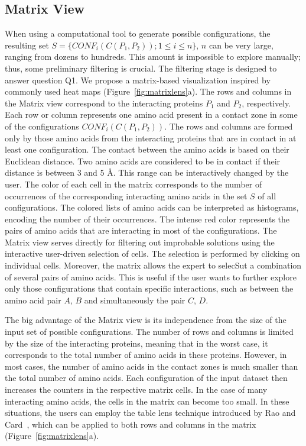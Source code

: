 \documentclass{bmcart}
\def\MatView {Matrix view\xspace}
\begin{document}
\subsection*{Matrix View}
\label{sec:matview}
When using a computational tool to generate possible configurations, the resulting set $S = \{CONF_i(C(P_1,P_2)); 1 \leq i \leq n\}$, $n$ can be very large, ranging from dozens to hundreds. 
This amount is impossible to explore manually; thus, some preliminary filtering is crucial.
The filtering stage is designed to answer question Q1.
We propose a matrix-based visualization inspired by commonly used heat maps (Figure~\ref{fig:matrixlens}a).
The rows and columns in the \MatView correspond to the interacting proteins $P_1$ and $P_2$, respectively.
Each row or column represents one amino acid present in a contact zone in some of the configurations $CONF_i(C(P_1,P_2))$. 
The rows and columns are formed only by those amino acids from the interacting proteins that are in contact in at least one configuration.
The contact between the amino acids is based on their Euclidean distance. 
Two amino acids are considered to be in contact if their distance is between 3 and 5 \AA.
This range can be interactively changed by the user.
The color of each cell in the matrix corresponds to the number of occurrences of the corresponding interacting amino acids in the set $S$ of all configurations. 
The colored lists of amino acids can be interpreted as histograms, encoding the number of their occurrences.
The intense red color represents the pairs of amino acids that are interacting in most of the configurations.
The \MatView serves directly for filtering out improbable solutions using the interactive user-driven selection of cells.
The selection is performed by clicking on individual cells. 
Moreover, the matrix allows the expert to selecSut a combination of several pairs of amino acids.
This is useful if the user wants to further explore only those configurations that contain specific interactions, such as between the amino acid pair $A$, $B$ and simultaneously the pair $C$, $D$. 


The big advantage of the \MatView is its independence from the size of the input set of possible configurations.
The number of rows and columns is limited by the size of the interacting proteins, meaning that in the worst case, it corresponds to the total number of amino acids in these proteins.
However, in most cases, the number of amino acids in the contact zones is much smaller than the total number of amino acids.
Each configuration of the input dataset then increases the counters in the respective matrix cells.
In the case of many interacting amino acids, the cells in the matrix can become too small.
In these situations, the users can employ the table lens technique introduced by Rao and Card~\cite{Rao1994}, which can be applied to both rows and columns in the matrix (Figure~\ref{fig:matrixlens}a).
\end{document}
